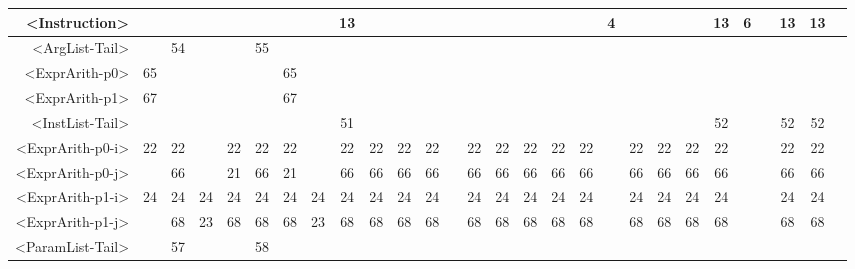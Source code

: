 \begin{tabular}{r|c@{ }c@{ }c@{ }c@{ }c@{ }c@{ }c@{ }c@{ }c@{ }c@{ }c@{ }c@{ }c@{ }c@{ }c@{ }c@{ }c@{ }c@{ }c@{ }c@{ }c@{ }c@{ }c@{ }c@{ }c@{ }c@{ }c@{ }}
<Instruction> &   &   &   &   &   &   &   & 13 &   &   &   &   &   &   &   &   &   & 4 &   &   &   & 13 & 6 &   & 13 & 13 &   \\\hline
<ArgList-Tail> &   & 54 &   &   & 55 &   &   &   &   &   &   &   &   &   &   &   &   &   &   &   &   &   &   &   &   &   &   \\\hline
<ExprArith-p0> & 65 &   &   &   &   & 65 &   &   &   &   &   &   &   &   &   &   &   &   &   &   &   &   &   &   &   &   &   \\\hline
<ExprArith-p1> & 67 &   &   &   &   & 67 &   &   &   &   &   &   &   &   &   &   &   &   &   &   &   &   &   &   &   &   &   \\\hline
<InstList-Tail> &   &   &   &   &   &   &   & 51 &   &   &   &   &   &   &   &   &   &   &   &   &   & 52 &   &   & 52 & 52 &   \\\hline
<ExprArith-p0-i> & 22 & 22 &   & 22 & 22 & 22 &   & 22 & 22 & 22 & 22 &   & 22 & 22 & 22 & 22 & 22 &   & 22 & 22 & 22 & 22 &   &   & 22 & 22 &   \\\hline
<ExprArith-p0-j> &   & 66 &   & 21 & 66 & 21 &   & 66 & 66 & 66 & 66 &   & 66 & 66 & 66 & 66 & 66 &   & 66 & 66 & 66 & 66 &   &   & 66 & 66 &   \\\hline
<ExprArith-p1-i> & 24 & 24 & 24 & 24 & 24 & 24 & 24 & 24 & 24 & 24 & 24 &   & 24 & 24 & 24 & 24 & 24 &   & 24 & 24 & 24 & 24 &   &   & 24 & 24 &   \\\hline
<ExprArith-p1-j> &   & 68 & 23 & 68 & 68 & 68 & 23 & 68 & 68 & 68 & 68 &   & 68 & 68 & 68 & 68 & 68 &   & 68 & 68 & 68 & 68 &   &   & 68 & 68 &   \\\hline
<ParamList-Tail> &   & 57 &   &   & 58 &   &   &   &   &   &   &   &   &   &   &   &   &   &   &   &   &   &   &   &   &   &   \\\hline
\end{tabular}


